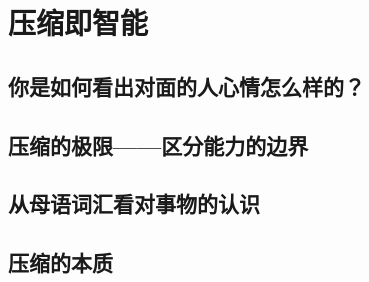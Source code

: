 \section{压缩即智能}
\subsection{你是如何看出对面的人心情怎么样的？}
\subsection{压缩的极限——区分能力的边界}
\subsection{从母语词汇看对事物的认识}
\subsection{压缩的本质}